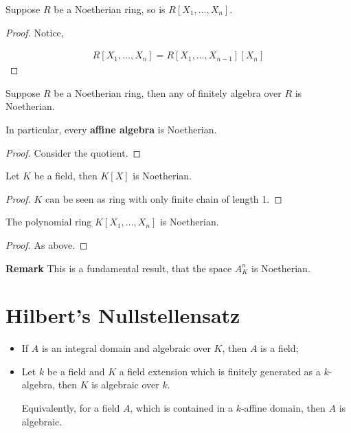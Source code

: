 \documentclass[Total.tex]{subfiles}
\begin{document}
		\begin{corollary}
			Suppose $R$ be a Noetherian ring, so is $R[X_1,\dots,X_n]$.
		\end{corollary}
		
		\begin{proof}
			Notice,
			
			\begin{gather*}
				R[X_1,\dots,X_n]=R[X_1,\dots,X_{n-1}][X_n]
			\end{gather*}
		\end{proof}
		
		\begin{corollary}
			Suppose $R$ be a Noetherian ring, then any of finitely algebra over $R$ is Noetherian. 
			
			In particular, every \textbf{affine algebra} is Noetherian.
		\end{corollary}
		
		\begin{proof}
			Consider the quotient.
		\end{proof}
		
		\begin{lemma}
			Let $K$ be a field, then $K[X]$ is Noetherian.
		\end{lemma}
		
		\begin{proof}
			$K$ can be seen as ring with only finite chain of length 1.
		\end{proof}
		
		\begin{corollary}
			The polynomial ring $K[X_1,\dots,X_n]$ is Noetherian.
		\end{corollary}
		
		\begin{proof}
			As above.
		\end{proof}	
		
		\textbf{Remark} This is a fundamental result, that the space $A^n_K$ is Noetherian.
		
		\section{Hilbert's Nullstellensatz}
		
			
				\begin{lemma}
					\begin{itemize}
						\item If $A$ is an integral domain and algebraic over $K$, then $A$ is a field;
						\item Let $k$ be a field and $K$ a field extension which is finitely generated as a $k$-algebra, then $K$ is algebraic over $k$.
						
						Equivalently, for a field $A$, which is contained in a $k$-affine domain, then $A$ is algebraic.	
					\end{itemize}
				\end{lemma}
				
\end{document}
